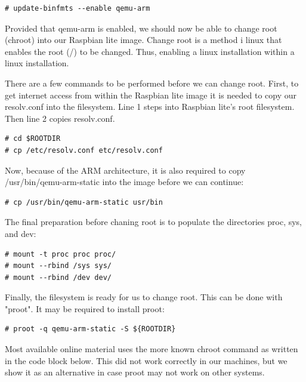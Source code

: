 \begin{lstlisting}[]
# update-binfmts --enable qemu-arm
\end{lstlisting}
\FloatBarrier
\vspace{-5mm}

Provided that qemu-arm is enabled, we should now be able to change root (chroot)
into our Raspbian lite image. Change root is a method i linux that enables
the root (/) to be changed. Thus, enabling a linux installation within a
linux installation.

There are a few commands to be performed before we can change root.
First, to get internet access from within the Raspbian lite image it is needed
to copy our resolv.conf into the filesystem. Line 1 steps into Raspbian lite's
root filesystem. Then line 2 copies resolv.conf.

\begin{lstlisting}[]
# cd $ROOTDIR
# cp /etc/resolv.conf etc/resolv.conf
\end{lstlisting}
\FloatBarrier
\vspace{-5mm}

Now, because of the ARM architecture, it is also required to copy
/usr/bin/qemu-arm-static into the image before we can continue:

\begin{lstlisting}[]
# cp /usr/bin/qemu-arm-static usr/bin
\end{lstlisting}
\FloatBarrier
\vspace{-5mm}

The final preparation before chaning root is to populate the directories proc,
sys, and dev:

\begin{lstlisting}[]
# mount -t proc proc proc/
# mount --rbind /sys sys/
# mount --rbind /dev dev/
\end{lstlisting}
\FloatBarrier
\vspace{-5mm}

Finally, the filesystem is ready for us to change root. This can be done with
"proot". It may be required to install proot:

\begin{lstlisting}[]
# proot -q qemu-arm-static -S ${ROOTDIR}
\end{lstlisting}
\FloatBarrier
\vspace{-5mm}

Most available online material uses the more known chroot command as written in
the code block below. This did not work correctly in our machines, but we show
it as an alternative in case proot may not work on other systems.

